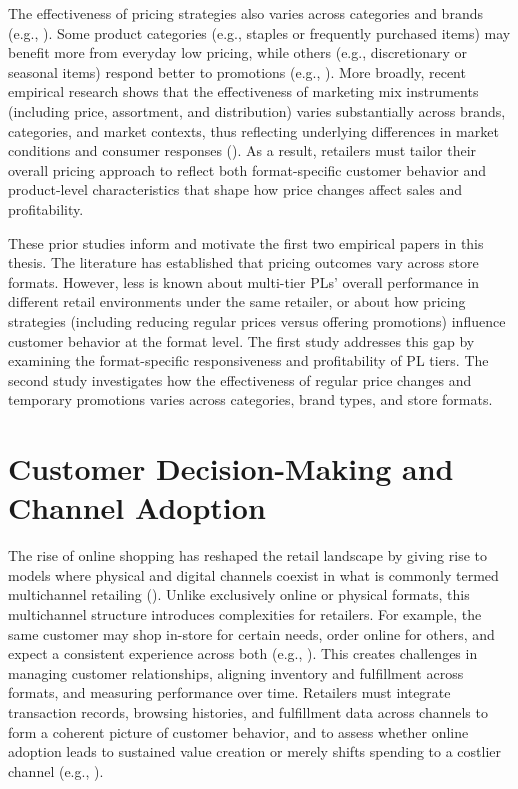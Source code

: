 The effectiveness of pricing strategies also varies across categories and brands (e.g., \cite{Osuna2016-re} ). Some product categories (e.g., staples or frequently purchased items) may benefit more from everyday low pricing, while others (e.g., discretionary or seasonal items) respond better to promotions (e.g., \cite{Dhar2001-gk, Raju1992-kl}). More broadly, recent empirical research shows that the effectiveness of marketing mix instruments (including price, assortment, and distribution) varies substantially across brands, categories, and market contexts, thus reflecting underlying differences in market conditions and consumer responses (\cite{Gielens2025-pa}). As a result, retailers must tailor their overall pricing approach to reflect both format-specific customer behavior and product-level characteristics that shape how price changes affect sales and profitability.

These prior studies inform and motivate the first two empirical papers in this thesis. The literature has established that pricing outcomes vary across store formats. However, less is known about multi-tier PLs’ overall performance in different retail environments under the same retailer, or about how pricing strategies (including reducing regular prices versus offering promotions) influence customer behavior at the format level. The first study addresses this gap by examining the format-specific responsiveness and profitability of PL tiers. The second study investigates how the effectiveness of regular price changes and temporary promotions varies across categories, brand types, and store formats.

\section{Customer Decision-Making and Channel Adoption}
\label{sec:lit_channel}

The rise of online shopping has reshaped the retail landscape by giving rise to models where physical and digital channels coexist in what is commonly termed multichannel retailing (\cite{Verhoef2015-mq}). Unlike exclusively online or physical formats, this multichannel structure introduces complexities for retailers. For example, the same customer may shop in-store for certain needs, order online for others, and expect a consistent experience across both (e.g., \cite{Li2015-tq,Wang2015-vc}). This creates challenges in managing customer relationships, aligning inventory and fulfillment across formats, and measuring performance over time. Retailers must integrate transaction records, browsing histories, and fulfillment data across channels to form a coherent picture of customer behavior, and to assess whether online adoption leads to sustained value creation or merely shifts spending to a costlier channel (e.g., \cite{Neslin2009-tw, Reinartz2019-cr, Verhoef2010-wh}).

